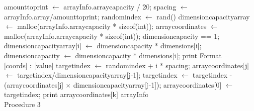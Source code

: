 \documentclass[10pt,twocolumn]{witseiepaper}
\begin{document}
\begin{appendix}
\begin{algorithm}[htbp]
	\begin{algorithmic}
		\State amount\textunderscore to\textunderscore print $\leftarrow$ arrayInfo.array\textunderscore capacity / 20;
		\State spacing $\leftarrow$ arrayInfo.array/amount\textunderscore to\textunderscore print;
		\State random\textunderscore index $\leftarrow$ rand() %
		\State dimension\textunderscore capacity\textunderscore array $\leftarrow$ malloc(arrayInfo.array\textunderscore capacity * sizeof(int));
		\State array\textunderscore coordinates $\leftarrow$ malloc(arrayInfo.array\textunderscore capacity * sizeof(int));
		\State dimension\textunderscore capacity == 1;
		\State dimension\textunderscore capacity\textunderscore array[i] $\leftarrow$ dimension\textunderscore capacity *  dimensions[i];
		\State dimension\textunderscore capacity $\leftarrow$ dimension\textunderscore capacity * dimensions[i];
		\EndFor
		\EndFunction
		\State print Format = [coords] : [value]
		\State target\textunderscore index $\leftarrow$ random\textunderscore index + i * spacing;
		\State array\textunderscore coordinates[j] $\leftarrow$ target\textunderscore index/dimension\textunderscore capacity\textunderscore array[j-1];
		\State target\textunderscore index $\leftarrow$ target\textunderscore index - (array\textunderscore coordinates[j] $\times$ \textunderscore dimension\textunderscore capacity\textunderscore array[j-1]);
		\EndIf
		\State array\textunderscore coordinates[0] $\leftarrow$ target\textunderscore index;
		\EndFor
		\State print array\textunderscore coordinates[k]
		\EndFor
		\EndFor
		\State \Return arrayInfo 
		\EndFunction \\
		\caption{Procedure 3}
		\label{alg:3}
	\end{algorithmic}
\end{algorithm}


\end{appendix}
\end{document}
